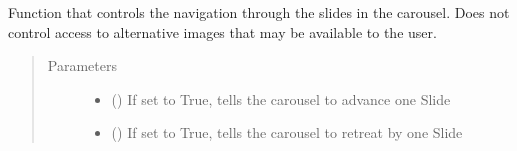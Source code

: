 \documentclass[letterpaper,10pt,english]{sphinxmanual}
\begin{document}
\begin{fulllineitems}

\begin{fulllineitems}
\label{\detokenize{polo.widgets:polo.widgets.slideshow_viewer.Carousel.controls}}
Function that controls the navigation through the slides
in the carousel. Does not control access to alternative
images that may be available to the user.
\begin{quote}\begin{description}
\item[{Parameters}] \leavevmode\begin{itemize}
\item {} 
 () \textendash{} If set to True, tells the carousel to             advance one Slide

\item {} 
 () \textendash{} If set to True, tells the carousel to             retreat by one Slide

\end{itemize}

\end{description}\end{quote}

\end{fulllineitems}


\begin{fulllineitems}
\label{\detokenize{polo.widgets:polo.widgets.slideshow_viewer.Carousel.current_slide}}
\end{fulllineitems}


\end{fulllineitems}

\end{document}
